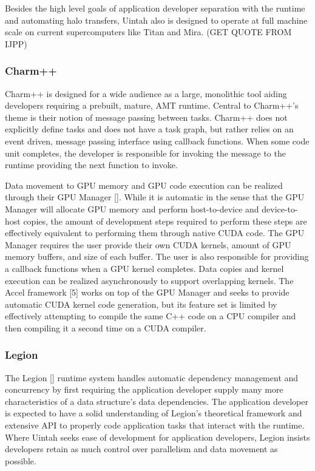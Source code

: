 \documentclass[12pt]{article}
\begin{document}
Besides the high level goals of application developer separation with the runtime and automating halo transfers, Uintah also is designed to operate at full machine scale on current supercomputers like Titan and Mira.  (GET QUOTE FROM IJPP)  

\subsubsection{Charm++}
\label{ch:charmpp}
Charm++ is designed for a wide audience as a large, monolithic tool aiding developers requiring a prebuilt, mature, AMT runtime. Central to Charm++'s theme is their notion of message passing between tasks.  Charm++ does not explicitly define tasks and does not have a task graph, but rather relies on an event driven, message passing interface using callback functions.  When some code unit completes, the developer is responsible for invoking the message to the runtime providing the next function to invoke.  

Data movement to GPU memory and GPU code execution can be realized through their GPU Manager [].   While it is automatic in the sense that the GPU Manager will allocate GPU memory and perform host-to-device and device-to-host copies, the amount of development steps required to perform these steps are effectively equivalent to performing them through native CUDA code.  The GPU Manager requires the user provide their own CUDA kernels, amount of GPU memory buffers, and size of each buffer.  The user is also responsible for providing a callback functions when a GPU kernel completes.   Data copies and kernel execution can be realized asynchronously to support overlapping kernels.  The Accel framework [5] works on top of the GPU Manager and seeks to provide automatic CUDA kernel code generation, but its feature set is limited by effectively attempting to compile the same C++ code on a CPU compiler and then compiling it a second time on a CUDA compiler.

\subsubsection{Legion}
\label{ch:legion}
The Legion [] runtime system handles automatic dependency management and concurrency by first requiring the application developer supply many more characteristics of a data structure’s data dependencies.  The application developer is expected to have a solid understanding of Legion’s theoretical framework and extensive API to properly code application tasks that interact with the runtime.  Where Uintah seeks ease of development for application developers, Legion insists developers retain as much control over parallelism and data movement as possible.  
\end{document}
